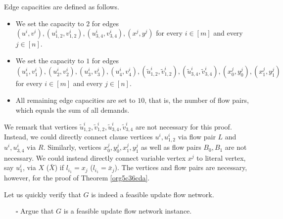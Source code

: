 \documentclass[fontsize=11pt,paper=a4]{book}
\begin{document}
Edge capacities are defined as follows.

\begin{itemize}
\item We set the capacity to \(2\) for edges \((u^i,v^i),(u_{1,2}^i,v_{1,2}^i),(u_{3,4}^i,v_{3,4}^i),(x^j,y^j)\) for every \(i\in[m]\) and every \(j\in[n]\).
\item We set the capacity to \(1\) for edges \((u_1^i,v_1^i),(u_2^i,v_2^i),(u_3^i,v_3^i),(u_4^i,v_4^i),(\tilde{u}_{1,2}^i,\tilde{v}_{1,2}^i),(\tilde{u}_{3,4}^i,\tilde{v}_{3,4}^i),(x_0^j,y_0^j),(x_1^j,y_1^j)\) for every \(i\in[m]\) and every \(j\in[n]\).
\item All remaining edge capacities are set to \(10\), that is, the number of flow pairs, which equals the sum of all demands.
\end{itemize}

We remark that vertices \(\tilde{u}_{1,2}^i,\tilde{v}_{1,2}^i,\tilde{u}_{3,4}^i,\tilde{v}_{3,4}^i\) are not necessary for this proof.
Instead, we could directly connect clause vertices \(u^i,u_{1,2}^i\) via flow pair \(L\) and \(u^i,u_{3,4}^i\) via \(R\).
Similarly, vertices \(x_0^j,y_0^j,x_1^j,y_1^j\) as well as flow pairs \(B_0,B_1\) are not necessary.
We could instead directly connect variable vertex \(x^j\) to literal vertex, say \(u_1^i\), via \(X\) (\(\bar{X}\)) if \(l_{i_1}=x_j\) (\(l_{i_1}=\bar{x}_j\)).
The vertices and flow pairs are necessary, however, for the proof of Theorem \ref{org5c36cda}.

Let us quickly verify that \(G\) is indeed a feasible update flow network.

\begin{itemize}
\item[{$\square$}] Argue that \(G\) is a feasible update flow network instance.
\end{itemize}
\end{document}
